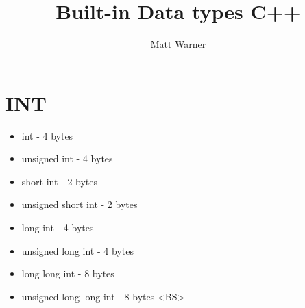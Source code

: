 \documentclass{report}
\title{\Huge{Built-in Data types C++}}
\author{\huge{Matt Warner}}
\date{\huge{}}
\begin{document}
  \maketitle
  \section{INT}
  \begin{itemize}
    \item int - 4 bytes
    \item unsigned int - 4 bytes
    \item short int - 2 bytes 
    \item unsigned short int - 2 bytes
    \item long int - 4 bytes
    \item unsigned long int - 4 bytes
    \item long long int - 8 bytes
    \item unsigned long long int - 8 bytes
    <BS>
  \end{itemize}
\end{document}
